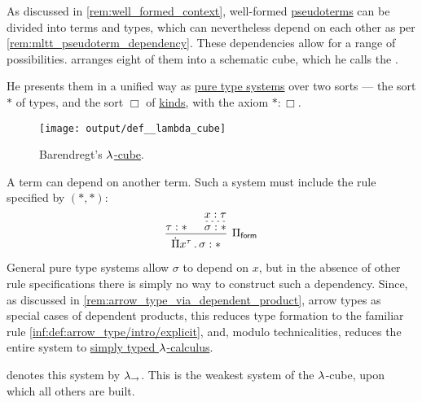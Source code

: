 \begin{definition}\label{def:lambda_cube}
   As discussed in \cref{rem:well_formed_context}, well-formed \hyperref[con:pseudoterm_expression]{pseudoterms} can be divided into terms and types, which can nevertheless depend on each other as per \cref{rem:mltt_pseudoterm_dependency}. These dependencies allow for a range of possibilities.  arranges eight of them into a schematic cube, which he calls the .

  He presents them in a unified way as \hyperref[def:pure_type_system]{pure type systems} over two sorts --- the sort \( \ast \) of types, and the sort \( \Box \) of \hyperref[con:type_universe]{kinds}, with the axiom \( \ast: \Box \).

  \begin{figure}[!ht]
    \centering
    \texttt{[image: output/def\_\_lambda\_cube]}
    \caption{Barendregt's \hyperref[def:lambda_cube]{\( {\mathrm \lambda} \)-cube}.}\label{fig:def:lambda_cube}
  \end{figure}

  \begin{thmenum}
     A term can depend on another term. Such a system must include the rule specified by \( (\ast, \ast) \):
    \begin{equation*}
      \begin{prooftree}
        \hypo{ \tau: \ast }

        \hypo{ x: \tau }
        \infer[dashed]1{ \sigma: \ast }

        \infer2[\ensuremath{ \Pi_{\logic{form}} }]{ \qprod {x^\tau} \sigma: \ast }
      \end{prooftree}
    \end{equation*}

    General pure type systems allow \( \sigma \) to depend on \( x \), but in the absence of other rule specifications there is simply no way to construct such a dependency. Since, as discussed in \cref{rem:arrow_type_via_dependent_product}, arrow types as special cases of dependent products, this reduces type formation to the familiar rule \ref{inf:def:arrow_type/intro/explicit}, and, modulo technicalities, reduces the entire system to \hyperref[con:simple_type_theory/arrow]{simply typed \( {\mathrm \lambda} \)-calculus}.

     denotes this system by \( {\mathrm \lambda}_{\rightarrow} \). This is the weakest system of the \( {\mathrm \lambda} \)-cube, upon which all others are built.


\end{thmenum}
\end{definition}
